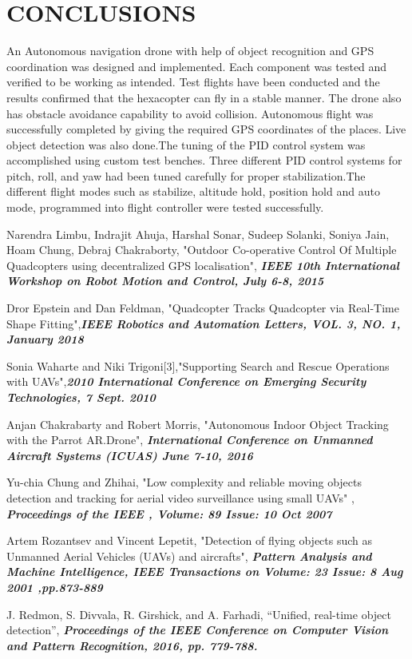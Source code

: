 \documentclass[12pt,a4paper]{report}
\begin{document}
\chapter{{CONCLUSIONS}}


\hspace*{1cm} An Autonomous navigation drone with help of object recognition and GPS coordination was designed and implemented. Each component was tested and verified to be working as intended. Test flights have been
conducted and the results confirmed that the hexacopter can fly in a stable manner.
The drone also has obstacle avoidance capability to avoid collision.
Autonomous flight was successfully completed by giving the required GPS coordinates of the places. Live object detection was also done.The tuning of the PID control system was accomplished using custom test benches. Three different PID control systems for pitch, roll, and yaw had been tuned carefully for proper stabilization.The different flight modes such as stabilize, altitude hold, position hold and auto mode, programmed into flight controller were tested successfully.

\begin{thebibliography}{99}

\bibitem{}  Narendra Limbu, Indrajit Ahuja, Harshal Sonar, Sudeep Solanki, Soniya Jain, Hoam Chung, Debraj Chakraborty, "Outdoor Co-operative Control Of Multiple Quadcopters using decentralized
GPS localisation", \textbf{\emph{IEEE 10th International Workshop on Robot Motion and Control, July 6-8, 2015 }}

\bibitem{} Dror Epstein and Dan Feldman, "Quadcopter Tracks Quadcopter via Real-Time Shape Fitting",\textbf{\emph{IEEE Robotics and Automation Letters, VOL. 3, NO. 1, January 2018} }

\bibitem{}  Sonia Waharte and Niki Trigoni[3],"Supporting Search and Rescue Operations with
UAVs",\textbf{\emph{2010 International Conference on Emerging Security Technologies, 7 Sept. 2010}}

\bibitem{} Anjan Chakrabarty and Robert Morris, "Autonomous Indoor Object Tracking with the Parrot AR.Drone", \textbf{\emph{International Conference on Unmanned Aircraft Systems (ICUAS) June 7-10, 2016}}

\bibitem{} Yu-chia Chung and Zhihai, "Low complexity and reliable moving objects detection and tracking for aerial video surveillance using small UAVs" , \textbf{\emph{Proceedings of
the IEEE , Volume: 89 Issue: 10 Oct 2007}}

\bibitem{}  Artem Rozantsev and Vincent Lepetit, "Detection of flying objects such as Unmanned Aerial Vehicles (UAVs) and aircrafts", \textbf{\emph{Pattern Analysis and Machine Intelligence,
IEEE Transactions on Volume: 23 Issue: 8 Aug 2001
,pp.873-889 }}

\bibitem{} J. Redmon, S. Divvala, R. Girshick, and A. Farhadi, “Unified, real-time object detection”, \textbf{\emph{ Proceedings of the IEEE Conference on Computer Vision and Pattern Recognition, 2016, pp. 779-788.}}


\end{thebibliography}
\end{document}
